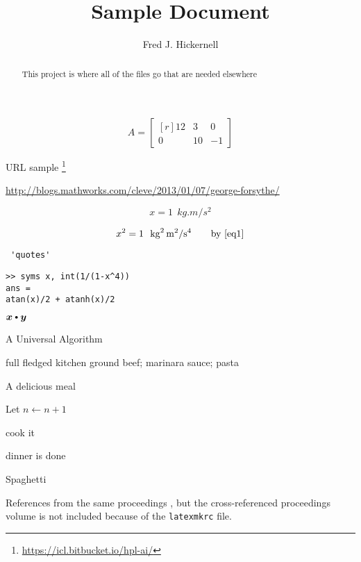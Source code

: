 \documentclass{amsart}
\begin{document}
\title{Sample Document}
\author{Fred J. Hickernell}
\begin{abstract}This project is where all of the files go that are needed elsewhere
\end{abstract}

\maketitle

\[
A = \begin{bmatrix*}[r]
     12 & 3  & 0 \\
     0  & 10 &-1 
   \end{bmatrix*}
\]

URL sample \footnote{\url{https://icl.bitbucket.io/hpl-ai/}}

\url{http://blogs.mathworks.com/cleve/2013/01/07/george-forsythe/}

\begin{equation} \label{eq1}
    x = 1 \ \ \si{kg.m/s^2}
\end{equation}

\begin{equation}
    x^2 = 1 \ \ \si{kg^2.m^2/s^4} \qquad \text{by } \eqref{eq1}
\end{equation}

\begin{verbatim} 'quotes' \end{verbatim}


\begin{Verbatim}[fontsize=\small,formatcom=\color{blue}]
>> syms x, int(1/(1-x^4))
ans =
atan(x)/2 + atanh(x)/2
\end{Verbatim}

$\vx \bigcdot \vy$

\begin{algorithm}[H]
\caption{A Universal Algorithm \label{alg:basicadapt}}
	\begin{algorithmic}
	\PARAM full fledged kitchen
	\INPUT ground beef; marinara sauce; pasta

    \Ensure A delicious meal

\Repeat

\State Let $n \leftarrow n + 1$

\State cook it

\Until dinner is done

\RETURN Spaghetti

\end{algorithmic}
\end{algorithm}

References from the same proceedings \cite{HicJim16a,JimHic16a}, but the cross-referenced proceedings volume is not included because of the \texttt{latexmkrc} file.



\end{document}
